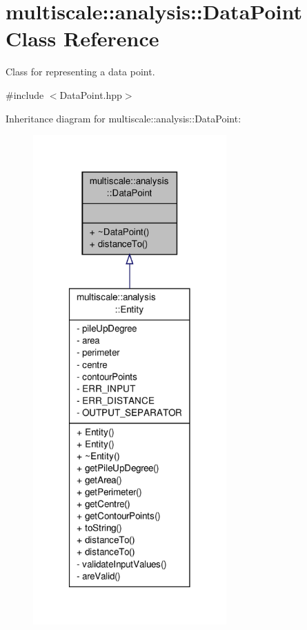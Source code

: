 \hypertarget{classmultiscale_1_1analysis_1_1DataPoint}{\section{multiscale\-:\-:analysis\-:\-:Data\-Point Class Reference}
\label{classmultiscale_1_1analysis_1_1DataPoint}
}


Class for representing a data point.  




{\ttfamily \#include $<$Data\-Point.\-hpp$>$}



Inheritance diagram for multiscale\-:\-:analysis\-:\-:Data\-Point\-:\nopagebreak
\begin{figure}[H]
\begin{center}
\leavevmode
\includegraphics[width=210pt]{classmultiscale_1_1analysis_1_1DataPoint__inherit__graph}
\end{center}
\end{figure}


